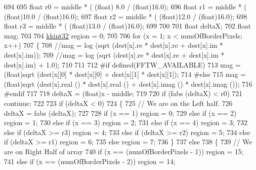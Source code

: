 \begin{DoxyCode}
694 
695   \textcolor{keywordtype}{float}  r0 = middle * ( (float) 8.0  /   (\textcolor{keywordtype}{float})16.0);
696   \textcolor{keywordtype}{float}  r1 = middle * ( (float)10.0  /   (\textcolor{keywordtype}{float})16.0);
697   \textcolor{keywordtype}{float}  r2 = middle * ( (float)12.0  /   (\textcolor{keywordtype}{float})16.0);
698   \textcolor{keywordtype}{float}  r3 = middle * ( (float)13.0  /   (\textcolor{keywordtype}{float})16.0);
699 
700 
701   \textcolor{keywordtype}{float}  deltaX;
702   \textcolor{keywordtype}{float}  mag;
703 
704   \hyperlink{namespace_k_k_b_a8fa4952cc84fda1de4bec1fbdd8d5b1b}{kkint32}  region = 0;
705 
706   \textcolor{keywordflow}{for}  (x = 1; x < numOfBorderPixels; x++)
707   \{
708     \textcolor{comment}{//mag = log (sqrt (dest[x].re * dest[x].re + dest[x].im * dest[x].im));}
709     \textcolor{comment}{//mag = log (sqrt (dest[x].re * dest[x].re + dest[x].im * dest[x].im) + 1.0);}
710 
711 
712 \textcolor{preprocessor}{    #if  defined(FFTW\_AVAILABLE)}
713       mag = (float)sqrt (dest[x][0] * dest[x][0] + dest[x][1] * dest[x][1]);
714 \textcolor{preprocessor}{    #else}
715       mag = (float)sqrt (dest[x].real () * dest[x].real () + dest[x].imag () * dest[x].imag ());
716 \textcolor{preprocessor}{    #endif}
717 
718     deltaX = (float)x - middle;
719 
720     \textcolor{keywordflow}{if}  (fabs (deltaX) < r0)
721       \textcolor{keywordflow}{continue};
722 
723     \textcolor{keywordflow}{if}  (deltaX < 0)
724     \{
725       \textcolor{comment}{// We are on the Left half.}
726       deltaX = fabs (deltaX);
727 
728       \textcolor{keywordflow}{if}       (x == 1)        region = 0;
729       \textcolor{keywordflow}{else} \textcolor{keywordflow}{if}  (x == 2)        region = 1;
730       \textcolor{keywordflow}{else} \textcolor{keywordflow}{if}  (x == 3)        region = 2;
731       \textcolor{keywordflow}{else} \textcolor{keywordflow}{if}  (x == 4)        region = 3;
732       \textcolor{keywordflow}{else} \textcolor{keywordflow}{if}  (deltaX >= r3)  region = 4;
733       \textcolor{keywordflow}{else} \textcolor{keywordflow}{if}  (deltaX >= r2)  region = 5;
734       \textcolor{keywordflow}{else} \textcolor{keywordflow}{if}  (deltaX >= r1)  region = 6;
735       \textcolor{keywordflow}{else}                     region = 7;
736     \}
737     \textcolor{keywordflow}{else}
738     \{
739       \textcolor{comment}{// We are on Right Half of array}
740       \textcolor{keywordflow}{if}       (x == (numOfBorderPixels - 1))  region = 15;
741       \textcolor{keywordflow}{else} \textcolor{keywordflow}{if}  (x == (numOfBorderPixels - 2))  region = 14;

\end{DoxyCode}
